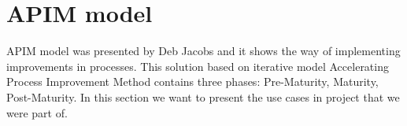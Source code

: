 \section{APIM model}


APIM model was presented by Deb Jacobs and it shows the way of implementing improvements in processes. This solution based on iterative model \cite{jacobs}
Accelerating Process Improvement Method contains three phases: Pre-Maturity, Maturity, Post-Maturity. In this section we want to present the use cases in project that we were part of.
